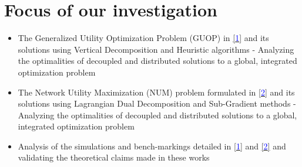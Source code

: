 \documentclass[12pt, draftcls, onecolumn]{IEEEtran}
\begin{document}
\section{Focus of our investigation}
\begin{itemize}
    \item The Generalized Utility Optimization Problem (GUOP) in \href{http://ieeexplore.ieee.org/stamp/stamp.jsp?tp=&arnumber=7859326&isnumber=7859429}{[\textcolor{blue}{1}]} and its solutions using Vertical Decomposition and Heuristic algorithms - Analyzing the optimalities of decoupled and distributed solutions to a global, integrated optimization problem
    \item The Network Utility Maximization (NUM) problem formulated in \href{http://ieeexplore.ieee.org/stamp/stamp.jsp?tp=&arnumber=6881740&isnumber=7180482}{[\textcolor{blue}{2}]} and its solutions using Lagrangian Dual Decomposition and Sub-Gradient methods - Analyzing the optimalities of decoupled and distributed solutions to a global, integrated optimization problem
    \item Analysis of the simulations and bench-markings detailed in \href{http://ieeexplore.ieee.org/stamp/stamp.jsp?tp=&arnumber=7859326&isnumber=7859429}{[\textcolor{blue}{1}]} and \href{http://ieeexplore.ieee.org/stamp/stamp.jsp?tp=&arnumber=6881740&isnumber=7180482}{[\textcolor{blue}{2}]} and validating the theoretical claims made in these works
\end{itemize}
\end{document}

